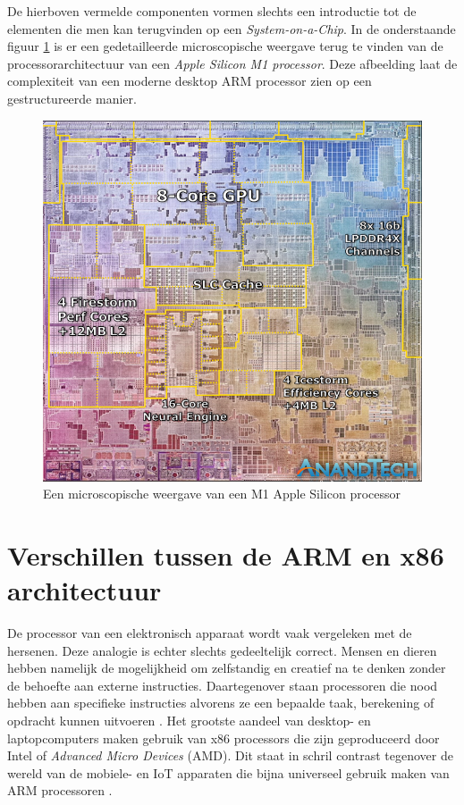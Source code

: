 De hierboven vermelde componenten vormen slechts een introductie tot de elementen die men kan terugvinden op een \textit{System-on-a-Chip}. In de onderstaande figuur \ref{M1family} is er een gedetailleerde microscopische weergave terug te vinden van de processorarchitectuur van een \textit{Apple Silicon M1 processor}. Deze afbeelding laat de complexiteit van een moderne desktop ARM processor zien op een gestructureerde manier.

\begin{figure}[!htb]
    \centering
    \includegraphics[width=\linewidth]{img/M1architecture.jpg}
    \caption{Een microscopische weergave van een M1 Apple Silicon processor \autocite{Frumusanu2020}}
    \label{M1family}
\end{figure}

\section{Verschillen tussen de ARM en x86 architectuur}
De processor van een elektronisch apparaat wordt vaak vergeleken met de hersenen. Deze analogie is echter slechts gedeeltelijk correct. Mensen en dieren hebben namelijk de mogelijkheid om zelfstandig en creatief na te denken zonder de behoefte aan externe instructies. Daartegenover staan processoren die nood hebben aan specifieke instructies alvorens ze een bepaalde taak, berekening of opdracht kunnen uitvoeren \autocite{Triggs2022a}. Het grootste aandeel van desktop- en laptopcomputers maken gebruik van x86 processors die zijn geproduceerd door Intel of \textit{Advanced Micro Devices} (AMD). Dit staat in schril contrast tegenover de wereld van de mobiele- en IoT apparaten die bijna universeel gebruik maken van ARM processoren \autocite{SarahHarris2015}.

